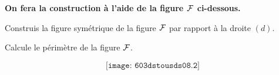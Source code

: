 {\bf On fera la construction à l'aide de la figure $\cal F$
ci-dessous.}
\begin{myenumerate}
\item Construis la figure symétrique de la figure $\cal F$ par rapport
à la droite $(d)$.
\item Calcule le périmètre de la figure $\cal F$.
\end{myenumerate}
\[\texttt{[image: 603dstousds08.2]}\]